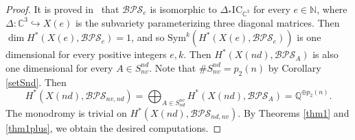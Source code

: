 \documentclass [11pt,oneside,a4paper,mathscr]{amsart}
\newtheorem{prop}[thm]{Proposition}
\theoremstyle{definition}
\renewcommand{\leq}{\leqslant}
\begin{document}
\begin{proof}%
    It is proved in~\cite[Theorem 5.1]{Dav}
    that  
    $\mathcal{BPS}_e$
    is isomorphic to $\Delta_{\ast}\mathrm{IC}_{\mathbb{C}^3}$ for every $e\in\mathbb{N}$, where $\Delta \colon \mathbb{C}^3\hookrightarrow X(e)$ is the subvariety parameterizing three diagonal matrices. Then $\dim H^{\ast}(X(e), \mathcal{BPS}_e)=1$, and so 
    $\mathrm{Sym}^k \left(H^{\ast}(X(e), \mathcal{BPS}_e)\right)$
    is one dimensional 
    for every positive integers $e, k$. 
    Then $H^{\ast}(X(nd), \mathcal{BPS}_A)$ is also one dimensional for every $A\in S^{nd}_{nv}$. Note that $\# S^{nd}_{nv}=p_2(n)$ by Corollary \ref{setSnd}.
    Then 
    \[H^{\ast}(X(nd), \mathcal{BPS}_{nv, nd})=\bigoplus_{A\in S^{nv}_{nd}}H^{\ast}(X(nd), \mathcal{BPS}_A)=\mathbb{Q}^{\oplus p_2(n)}.\]
    The monodromy is trivial on $H^{\ast}(X(nd), \mathcal{BPS}_{nd, nv})$. By Theorems \ref{thm1} and \ref{thm1plus}, we obtain
    the desired computations.
\end{proof}
\end{document}
